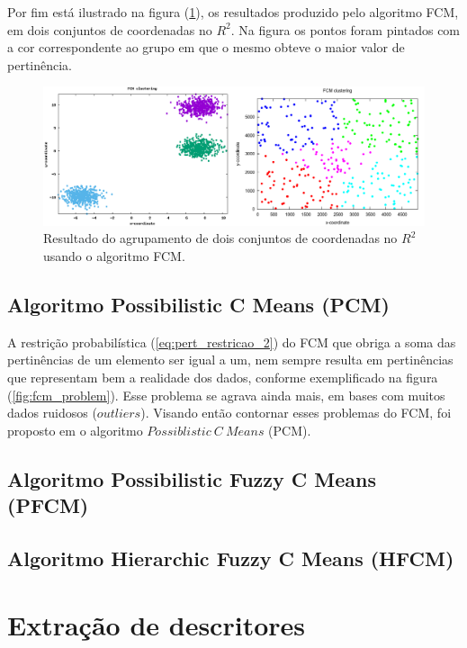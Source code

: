 Por fim está ilustrado na figura (\ref{fig:samples_fcm}), os resultados produzido pelo algoritmo
FCM, em dois conjuntos de coordenadas no $R^2$. Na figura os pontos foram pintados com a cor
correspondente ao grupo em que o mesmo obteve o maior valor de pertinência.

\begin{figure}[!htp] \centering \includegraphics[width=0.8\columnwidth]{assets/samples_fcm.png}
\caption{Resultado do agrupamento de dois conjuntos de coordenadas no $R^2$ usando o algoritmo
FCM\protect\footnotemark.} \label{fig:samples_fcm} \end{figure}

\subsection{Algoritmo Possibilistic C Means (PCM)}

A restrição probabilística (\ref{eq:pert_restricao_2}) do FCM que obriga a soma das pertinências de
um elemento ser igual a um, nem sempre resulta em pertinências que representam bem a realidade dos
dados, conforme exemplificado na figura (\ref{fig:fcm_problem}).  Esse problema se agrava ainda
mais, em bases com muitos dados ruidosos ($outliers$).  Visando então contornar esses problemas do
FCM, foi proposto em \cite{Krishnapuram1993} o algoritmo $Possiblistic\ C\ Means$ (PCM).


\subsection{Algoritmo Possibilistic Fuzzy C Means (PFCM)} \subsection{Algoritmo Hierarchic Fuzzy C
Means (HFCM)}

\section{Extração de descritores} 

